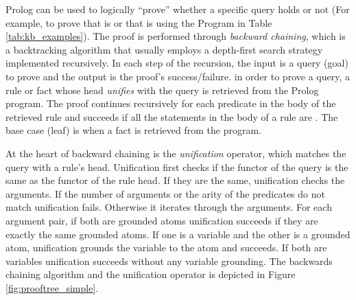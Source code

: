 Prolog can be used to logically ``prove'' whether a specific query holds or not (For example, to prove that  is  or that  is  using the Program in Table \ref{tab:kb_examples}). The proof is performed through \emph{backward chaining}, which is a backtracking algorithm that usually employs a depth-first search strategy implemented recursively. 
In each step of the recursion, the input is a query (goal) to prove and the output is the proof's success/failure. in order to prove a query, a rule or fact whose head \emph{unifies} with the query is retrieved from the Prolog program. The proof continues recursively for each predicate in the body of the retrieved rule and succeeds if all the statements in the body of a rule are . The base case (leaf) is when a fact is retrieved from the program.

At the heart of backward chaining is the \emph{unification} operator, which matches the query with a rule's head. Unification first checks if the functor of the query is the same as the functor of the rule head. If they are the same, unification checks the arguments. If the number of arguments or the arity of the predicates do not match unification fails. Otherwise it iterates through the arguments. For each argument pair, if both are grounded atoms unification succeeds if they are exactly the same grounded atoms. If one is a variable and the other is a grounded atom, unification grounds the variable to the atom and succeeds. If both are variables unification succeeds without any variable grounding. The backwards chaining algorithm and the unification operator is depicted in Figure \ref{fig:prooftree_simple}.




